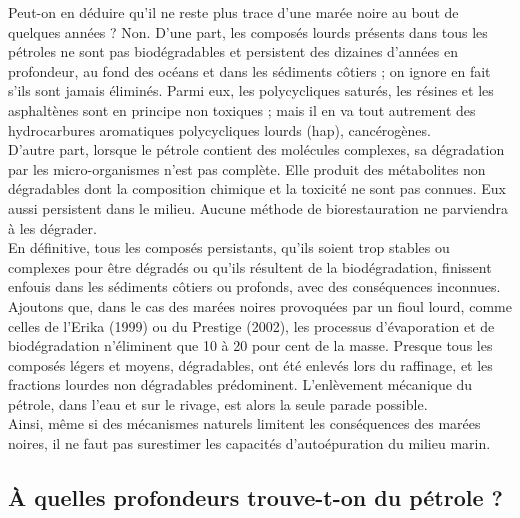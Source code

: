 \documentclass[8pt]{article}
\begin{document}
Peut-on en déduire qu'il ne reste plus trace d'une marée noire au bout de quelques années ? Non. D'une part, les composés lourds présents dans tous les pétroles ne sont pas biodégradables et persistent des dizaines d'années en profondeur, au fond des océans et dans les sédiments côtiers ; on ignore en fait s'ils sont jamais éliminés. Parmi eux, les polycycliques saturés, les résines et les asphaltènes sont en principe non toxiques ; mais il en va tout autrement des hydrocarbures aromatiques polycycliques lourds (hap), cancérogènes.\\

D'autre part, lorsque le pétrole contient des molécules complexes, sa dégradation par les micro-organismes n'est pas complète. Elle produit des métabolites non dégradables dont la composition chimique et la toxicité ne sont pas connues. Eux aussi persistent dans le milieu. Aucune méthode de biorestauration ne parviendra à les dégrader.\\

En définitive, tous les composés persistants, qu'ils soient trop stables ou complexes pour être dégradés ou qu'ils résultent de la biodégradation, finissent enfouis dans les sédiments côtiers ou profonds, avec des conséquences inconnues.\\

Ajoutons que, dans le cas des marées noires provoquées par un fioul lourd, comme celles de l'Erika (1999) ou du Prestige (2002), les processus d'évaporation et de biodégradation n'éliminent que 10 à 20 pour cent de la masse. Presque tous les composés légers et moyens, dégradables, ont été enlevés lors du raffinage, et les fractions lourdes non dégradables prédominent. L'enlèvement mécanique du pétrole, dans l'eau et sur le rivage, est alors la seule parade possible.\\

Ainsi, même si des mécanismes naturels limitent les conséquences des marées noires, il ne faut pas surestimer les capacités d'autoépuration du milieu marin.\\

\newpage
\subsection{À quelles profondeurs trouve-t-on du pétrole ?}
\label{sec:profondeur}
\end{document}
